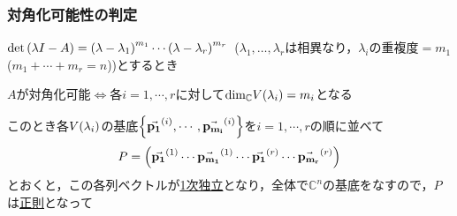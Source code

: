 \documentclass[autodetect-engine,dvipdfmx-if-dvi,ja=standard]{bxjsarticle}
\theoremstyle{mystyle1}
\theoremstyle{mystyle2}
\newcommand{\bbC}{\ensuremath{\mathbb{C}}}
\begin{document}
\subsubsection{対角化可能性の判定}
$\det\qty(\lambda I-A)=\qty(\lambda-\lambda_1)^{m_1}\cdots\qty(\lambda-\lambda_r)^{m_r}$\ ($\lambda_1,\ldots,\lambda_r$は相異なり，$\lambda_i$の重複度$=m_1$($m_1+\cdots+m_r=n$))とするとき
\begin{center}
  $A$が対角化可能$\Leftrightarrow$各$i=1,\cdots,r$に対して$\text{dim}_\bbC V\qty(\lambda_i)=m_i$となる
\end{center}

このとき各$V\qty(\lambda_i)$の基底$\qty{\va{p_1}^{\qty(i)},\cdots,\va{p_{m_i}}^{\qty(i)}}$を$i=1,\cdots,r$の順に並べて\begin{align*}
  P=\qty(\va{p_1}^{\qty(1)}\cdots\va{p_{m_1}}^{\qty(1)}\cdots\va{p_1}^{\qty(r)}\cdots\va{p_{m_r}}^{\qty(r)})
\end{align*}とおくと，この各列ベクトルが\underline{1次独立}となり，全体で$\bbC^n$の基底をなすので，$P$は\underline{正則}となって
\end{document}
